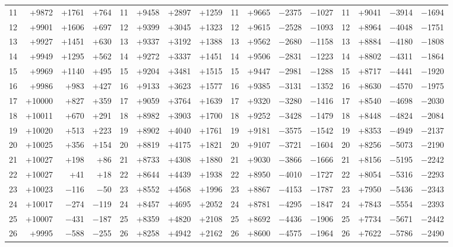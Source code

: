 \documentclass[10pt,a4paper]{article}
\begin{document}
\begin{center}
\begin{longtable}{@{}rrrrrrrrrrrrrrrr@{}}
11 & +9872 & +1761 & +764 & 11 & +9458 & +2897 & +1259 & 11 & +9665 & $-$2375 & $-$1027 & 11 & +9041 & $-$3914 & $-$1694 \\
12 & +9901 & +1606 & +697 & 12 & +9399 & +3045 & +1323 & 12 & +9615 & $-$2528 & $-$1093 & 12 & +8964 & $-$4048 & $-$1751 \\
13 & +9927 & +1451 & +630 & 13 & +9337 & +3192 & +1388 & 13 & +9562 & $-$2680 & $-$1158 & 13 & +8884 & $-$4180 & $-$1808 \\
14 & +9949 & +1295 & +562 & 14 & +9272 & +3337 & +1451 & 14 & +9506 & $-$2831 & $-$1223 & 14 & +8802 & $-$4311 & $-$1864 \\
15 & +9969 & +1140 & +495 & 15 & +9204 & +3481 & +1515 & 15 & +9447 & $-$2981 & $-$1288 & 15 & +8717 & $-$4441 & $-$1920 \\
16 & +9986 & +983 & +427 & 16 & +9133 & +3623 & +1577 & 16 & +9385 & $-$3131 & $-$1352 & 16 & +8630 & $-$4570 & $-$1975 \\
17 & +10000 & +827 & +359 & 17 & +9059 & +3764 & +1639 & 17 & +9320 & $-$3280 & $-$1416 & 17 & +8540 & $-$4698 & $-$2030 \\
18 & +10011 & +670 & +291 & 18 & +8982 & +3903 & +1700 & 18 & +9252 & $-$3428 & $-$1479 & 18 & +8448 & $-$4824 & $-$2084 \\
19 & +10020 & +513 & +223 & 19 & +8902 & +4040 & +1761 & 19 & +9181 & $-$3575 & $-$1542 & 19 & +8353 & $-$4949 & $-$2137 \\
20 & +10025 & +356 & +154 & 20 & +8819 & +4175 & +1821 & 20 & +9107 & $-$3721 & $-$1604 & 20 & +8256 & $-$5073 & $-$2190 \\
21 & +10027 & +198 & +86 & 21 & +8733 & +4308 & +1880 & 21 & +9030 & $-$3866 & $-$1666 & 21 & +8156 & $-$5195 & $-$2242 \\
22 & +10027 & +41 & +18 & 22 & +8644 & +4439 & +1938 & 22 & +8950 & $-$4010 & $-$1727 & 22 & +8054 & $-$5316 & $-$2293 \\
23 & +10023 & $-$116 & $-$50 & 23 & +8552 & +4568 & +1996 & 23 & +8867 & $-$4153 & $-$1787 & 23 & +7950 & $-$5436 & $-$2343 \\
24 & +10017 & $-$274 & $-$119 & 24 & +8457 & +4695 & +2052 & 24 & +8781 & $-$4295 & $-$1847 & 24 & +7843 & $-$5554 & $-$2393 \\
25 & +10007 & $-$431 & $-$187 & 25 & +8359 & +4820 & +2108 & 25 & +8692 & $-$4436 & $-$1906 & 25 & +7734 & $-$5671 & $-$2442 \\
26 & +9995 & $-$588 & $-$255 & 26 & +8258 & +4942 & +2162 & 26 & +8600 & $-$4575 & $-$1964 & 26 & +7622 & $-$5786 & $-$2490 \\

\end{longtable}
\end{center}
\end{document}
